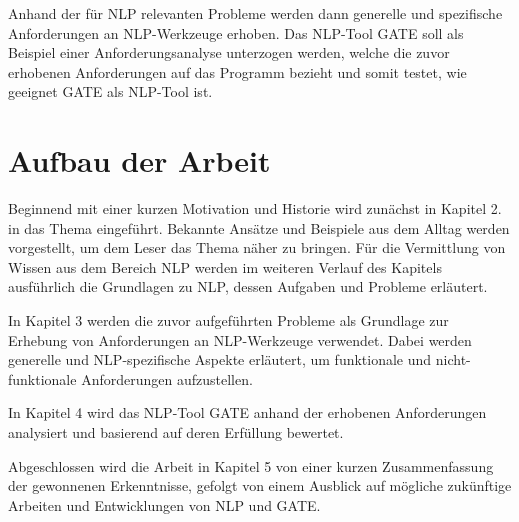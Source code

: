 \documentclass[12pt]{report}
\begin{document}
Anhand der für NLP relevanten Probleme werden dann generelle und spezifische Anforderungen an NLP-Werkzeuge erhoben. 
Das NLP-Tool GATE soll als Beispiel einer Anforderungsanalyse unterzogen werden, welche die zuvor erhobenen Anforderungen auf das Programm bezieht und somit testet, wie geeignet GATE als NLP-Tool ist.

\section{Aufbau der Arbeit}
Beginnend mit einer kurzen Motivation und Historie wird zunächst in Kapitel 2. in das Thema eingeführt. Bekannte Ansätze und Beispiele aus dem Alltag werden vorgestellt, um dem Leser das Thema näher zu bringen. Für die Vermittlung von Wissen aus dem Bereich NLP werden im weiteren Verlauf des Kapitels ausführlich die Grundlagen zu NLP, dessen Aufgaben und Probleme erläutert.

In Kapitel 3 werden die zuvor aufgeführten Probleme als Grundlage zur Erhebung von Anforderungen an NLP-Werkzeuge verwendet. Dabei werden generelle und NLP-spezifische Aspekte erläutert, um funktionale und nicht-funktionale Anforderungen aufzustellen.

In Kapitel 4 wird das NLP-Tool GATE anhand der erhobenen Anforderungen analysiert und basierend auf deren Erfüllung bewertet. 

Abgeschlossen wird die Arbeit in Kapitel 5 von einer kurzen Zusammenfassung der gewonnenen Erkenntnisse, gefolgt von einem Ausblick auf mögliche zukünftige Arbeiten und Entwicklungen von NLP und GATE. 
\end{document}
